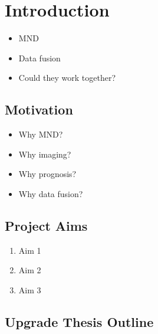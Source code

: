 \chapter{Introduction}
\label{introduction}

\begin{itemize}
\item MND
\item Data fusion
\item Could they work together?
\end{itemize}

\section{Motivation}

\begin{itemize}
    \item Why MND?
    \item Why imaging?
    \item Why prognosis?
    \item Why data fusion?
\end{itemize}

\section{Project Aims}

\begin{enumerate}
    \item Aim 1
    \item Aim 2
    \item Aim 3
\end{enumerate}

\section{Upgrade Thesis Outline}